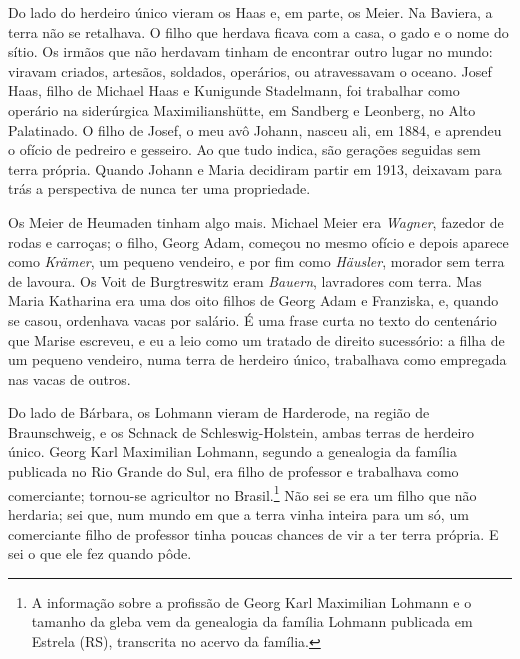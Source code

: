 \documentclass[
  brazilian,
  11pt,
  openany]{book}
\begin{document}
Do lado do herdeiro único vieram os Haas e, em parte, os Meier. Na
Baviera, a terra não se retalhava. O filho que herdava ficava com a
casa, o gado e o nome do sítio. Os irmãos que não herdavam tinham de
encontrar outro lugar no mundo: viravam criados, artesãos, soldados,
operários, ou atravessavam o oceano. Josef Haas, filho de Michael Haas e
Kunigunde Stadelmann, foi trabalhar como operário na siderúrgica
Maximilianshütte, em Sandberg e Leonberg, no Alto Palatinado. O filho de
Josef, o meu avô Johann, nasceu ali, em 1884, e aprendeu o ofício de
pedreiro e gesseiro. Ao que tudo indica, são gerações seguidas sem terra
própria. Quando Johann e Maria decidiram partir em 1913, deixavam para
trás a perspectiva de nunca ter uma propriedade.

Os Meier de Heumaden tinham algo mais. Michael Meier era \emph{Wagner},
fazedor de rodas e carroças; o filho, Georg Adam, começou no mesmo
ofício e depois aparece como \emph{Krämer}, um pequeno vendeiro, e por
fim como \emph{Häusler}, morador sem terra de lavoura. Os Voit de
Burgtreswitz eram \emph{Bauern}, lavradores com terra. Mas Maria
Katharina era uma dos oito filhos de Georg Adam e Franziska, e, quando
se casou, ordenhava vacas por salário. É uma frase curta no texto do
centenário que Marise escreveu, e eu a leio como um tratado de direito
sucessório: a filha de um pequeno vendeiro, numa terra de herdeiro
único, trabalhava como empregada nas vacas de outros.

Do lado de Bárbara, os Lohmann vieram de Harderode, na região de
Braunschweig, e os Schnack de Schleswig-Holstein, ambas terras de
herdeiro único. Georg Karl Maximilian Lohmann, segundo a genealogia da
família publicada no Rio Grande do Sul, era filho de professor e
trabalhava como comerciante; tornou-se agricultor no Brasil.\footnote{A
  informação sobre a profissão de Georg Karl Maximilian Lohmann e o
  tamanho da gleba vem da genealogia da família Lohmann publicada em
  Estrela (RS), transcrita no acervo da família.} Não sei se era um
filho que não herdaria; sei que, num mundo em que a terra vinha inteira
para um só, um comerciante filho de professor tinha poucas chances de
vir a ter terra própria. E sei o que ele fez quando pôde.
\end{document}
